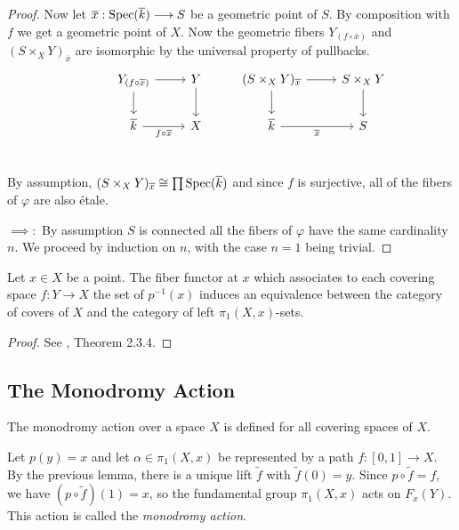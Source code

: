 \begin{proof}
	Now let $\overline{x} : \operatorname{Spec}(\overline{k}) \longrightarrow S$ be a geometric point of $S$. By composition with $f$ we get a geometric point of $X$. Now the geometric fibers $Y_{(f \circ \overline{x})}$ and $(S \times_X Y)_{\overline{x}}$  are isomorphic by the universal property of pullbacks.
	\[
		\begin{tikzcd}
			& {Y_{(f \circ \overline{x})}} & Y & {(S \times_X Y)_{\overline{x}}} & {S \times_X Y} \\
			& {\overline{k}} & X & {\overline{k}} & S \\
			{}
			\arrow[from=1-3, to=2-3]
			\arrow[from=1-2, to=1-3]
			\arrow["{f \circ \overline{x}}"', from=2-2, to=2-3]
			\arrow[from=1-2, to=2-2]
			\arrow[from=1-4, to=2-4]
			\arrow[from=1-4, to=1-5]
			\arrow[from=1-5, to=2-5]
			\arrow["{\overline{x}}"', from=2-4, to=2-5]
		\end{tikzcd}
	\]
	By assumption, $(S\times_X Y)_{\overline{x}} \cong \prod \operatorname{Spec}(\overline{k})$ and since $f$ is surjective, all of the fibers of $\varphi$ are also \'etale.
	\par $\implies:$ By assumption $S$ is connected all the fibers of $\varphi$ have the same cardinality $n$. We proceed by induction on $n$, with the case $n = 1$ being trivial.
\end{proof}

\begin{theorem}\label{theorem:fiber_functor}
	Let $x \in  X$ be a point. The fiber functor at $x$ which associates to each covering space $f: Y \to X$ the set of $p^{-1}(x)$ induces an equivalence between the category of covers of $X$ and the category of left $\pi_1(X,x)$-sets.
\end{theorem}

\begin{proof}
	See \cite{Szamuely}, Theorem 2.3.4.
\end{proof}


\subsection{The Monodromy Action}
The monodromy action over a space $X$ is defined for all covering spaces of $X$.
\begin{construction}
	Let $p(y)=x$ and let $\alpha \in \pi_1(X,x)$ be represented by a path $f: [0,1] \to X$. By the previous lemma, there is a unique lift $\tilde{f}$ with $\tilde{f}(0) = y$. Since $p \circ \tilde{f} = f$, we have $(p \circ \tilde{f})(1) = x$, so the fundamental group $\pi_1(X, x)$ acts on $F_x(Y)$. This action is called the \textit{monodromy action}.
\end{construction}

